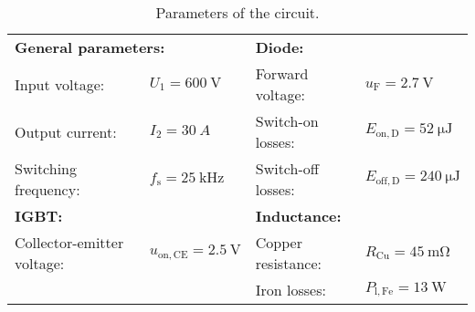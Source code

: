 %
\begin{table}[ht]
    \centering  %
    \begin{tabular}{llll}
        \toprule
        \multicolumn{2}{l}{\textbf{General parameters:}} & \multicolumn{2}{l}{\textbf{Diode:}} \\ 
        Input voltage: &  $U_{\mathrm{1}} = \SI{600}{\volt}$ & Forward voltage: & $u_{\mathrm{F}} = \SI{2.7}{\volt}$ \\
        Output current: & $I_2 = \SI{30}{A}$  & Switch-on losses: & $E_{\text{on},\mathrm{D}} = \SI{52}{\micro\joule}$ \\
        Switching frequency: & $f_{\mathrm{s}} = \SI{25}{\kilo\hertz}$  & Switch-off losses: & $E_{\text{off},\mathrm{D}} = \SI{240}{\micro\joule}$ \\
        \midrule
        \multicolumn{2}{l}{\textbf{IGBT:}} & \multicolumn{2}{l}{\textbf{Inductance:}} \\ 
        Collector-emitter voltage: & $u_{\mathrm{on},\mathrm{CE}} = \SI{2.5}{\volt}$ & Copper resistance: & $R_{\text{Cu}} = \SI{45}{\milli\ohm}$  \\
        & &  Iron losses: & $P_{\mathrm{l},\text{Fe}} = \SI{13}{\watt}$ \\
        \bottomrule
    \end{tabular}
    \caption{Parameters of the circuit.}  %
    \label{table:Parameters of the circuit}
\end{table}
%



